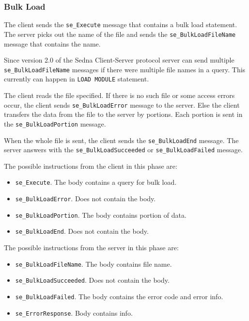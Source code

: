 \documentclass[a4paper,12pt]{article}
\newenvironment{citemize}
{\begin{itemize}
  \setlength{\itemsep}{0pt}
  \setlength{\parskip}{0pt}
  \setlength{\parsep}{0pt}}
{\end{itemize}}
\begin{document}
\subsubsection{Bulk Load}

The client sends the \verb!se_Execute! message that contains a bulk load
statement. The server picks out the name of the file and sends the
\verb!se_BulkLoadFileName! message that contains the name.

Since version 2.0 of the Sedna Client-Server protocol server can send multiple
\verb!se_BulkLoadFileName! messages if there were multiple file names in a
query. This currently can happen in \verb!LOAD MODULE! statement.

The client reads the file specified. If there is no such file or some access
errors occur, the client sends \verb!se_BulkLoadError! message to the server.
Else the client transfers the data from the file to the server by portions. Each
portion is sent in the \verb!se_BulkLoadPortion! message.

When the whole file is sent, the client sends the \verb!se_BulkLoadEnd! message.
The server answers with the \verb!se_BulkLoadSucceeded! or
\verb!se_BulkLoadFailed! message.

The possible instructions from the client in this phase are:
\begin{citemize}
\item \verb!se_Execute!. The body contains a query for bulk load.
\item \verb!se_BulkLoadError!. Does not contain the body.
\item \verb!se_BulkLoadPortion!. The body contains portion of data.
\item \verb!se_BulkLoadEnd!. Does not contain the body.
\end{citemize}

The possible instructions from the server in this phase are:
\begin{citemize}
\item \verb!se_BulkLoadFileName!. The body contains file name.
\item \verb!se_BulkLoadSucceeded!. Does not contain the body.
\item \verb!se_BulkLoadFailed!. The body contains the error code and error info.
\item \verb!se_ErrorResponse!. Body contains info.
\end{citemize}


\end{document}

